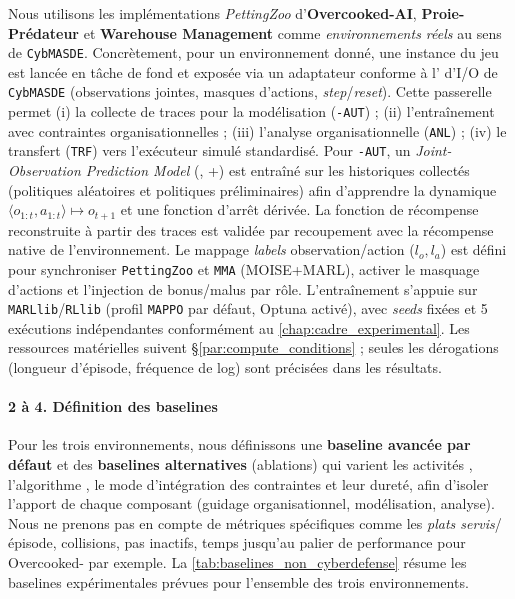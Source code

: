 Nous utilisons les implémentations \emph{PettingZoo} d’\textbf{Overcooked-AI}, \textbf{Proie-Prédateur} et \textbf{Warehouse Management} comme \emph{environnements réels} au sens de \texttt{CybMASDE}. Concrètement, pour un environnement donné, une instance du jeu est lancée en tâche de fond et exposée via un adaptateur  conforme à l’ d’I/O de \texttt{CybMASDE} (observations jointes, masques d’actions, \emph{step}/\emph{reset}). Cette passerelle permet (i) la collecte de traces pour la modélisation (\texttt{-AUT}) ; (ii) l’entraînement  avec contraintes organisationnelles ; (iii) l’analyse organisationnelle (\texttt{ANL}) ; (iv) le transfert (\texttt{TRF}) vers l’exécuteur simulé standardisé.
Pour \texttt{-AUT}, un \emph{Joint-Observation Prediction Model} (, +) est entraîné sur les historiques collectés (politiques aléatoires et politiques préliminaires) afin d’apprendre la dynamique $\langle o_{1:t},a_{1:t} \rangle \mapsto o_{t+1}$ et une fonction d’arrêt dérivée. La fonction de récompense reconstruite à partir des traces est validée par recoupement avec la récompense native de l'environnement. Le mappage \emph{labels} observation/action ($l_o, l_a$) est défini pour synchroniser \texttt{PettingZoo} et \texttt{MMA} (MOISE+MARL), activer le masquage d’actions et l’injection de bonus/malus par rôle. L’entraînement s’appuie sur \texttt{MARLlib}/\texttt{RLlib} (profil \texttt{MAPPO} par défaut, Optuna activé), avec \textit{seeds} fixées et 5 exécutions indépendantes conformément au \autoref{chap:cadre_experimental}. Les ressources matérielles suivent \S\ref{par:compute_conditions} ; seules les dérogations (longueur d’épisode, fréquence de log) sont précisées dans les résultats.

\paragraph{2 à 4. Définition des baselines}

Pour les trois environnements, nous définissons une \textbf{baseline avancée par défaut} et des \textbf{baselines alternatives} (ablations) qui varient les activités , l’algorithme , le mode d’intégration des contraintes et leur dureté, afin d’isoler l’apport de chaque composant (guidage organisationnel, modélisation, analyse). Nous ne prenons pas en compte de métriques spécifiques comme les \emph{plats servis}/épisode, collisions, pas inactifs, temps jusqu’au palier de performance pour Overcooked- par exemple. La \autoref{tab:baselines_non_cyberdefense} résume les baselines expérimentales prévues pour l'ensemble des trois environnements.

